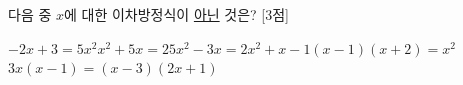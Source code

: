 다음 중 $x$에 대한 이차방정식이 \underline{아닌} 것은? \mbox{[3점]}
\begin{choicesii}{$-2x+3=5x^2$}{$x^2+5x=2$}{$5x^2-3x=2x^2+x-1$}{$(x-1)(x+2)=x^2$}{$3x(x-1)=(x-3)(2x+1)$}\end{choicesii}
